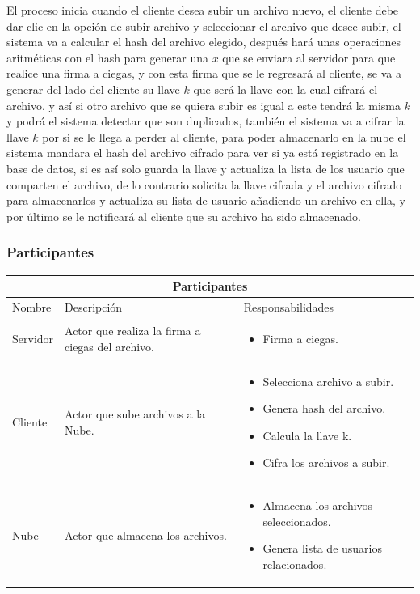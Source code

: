 El proceso inicia cuando el cliente desea subir un archivo nuevo, el cliente debe dar clic en la opción de subir archivo y seleccionar el archivo que desee subir, el sistema va a calcular el hash del archivo elegido, después hará unas operaciones aritméticas con el hash para generar una $x$ que se enviara al servidor para que realice una firma a ciegas, y con esta firma que se le regresará al cliente, se va a generar del lado del cliente su llave $k$ que será la llave con la cual cifrará el archivo, y así si otro archivo que se quiera subir es igual a este tendrá la misma $k$ y podrá el sistema detectar que son duplicados, también el sistema va a cifrar la llave $k$ por si se le llega a perder al cliente, para poder almacenarlo en la nube el sistema mandara el hash del archivo cifrado para ver si ya está registrado en la base de datos, si es así solo guarda la llave y actualiza la lista de los usuario que comparten el archivo, de lo contrario solicita la llave cifrada y el archivo cifrado para almacenarlos y actualiza su lista de usuario añadiendo un archivo en ella, y por último se le notificará al cliente que su archivo ha sido almacenado.



\subsubsection{Participantes}

\begin{tabular}{ |p{2cm}|p{6cm}|p{6cm}| }
\hline
\multicolumn{3}{|c|}{ Participantes } \\
\hline

{ Nombre } & { Descripción } & { Responsabilidades} \\
\hline
{ Servidor } & Actor que realiza la firma a ciegas del archivo. & 
\begin{itemize} 
\item Firma a ciegas.

\end{itemize} \\ 
\hline
{ Cliente } & Actor que sube archivos a la Nube. & 
\begin{itemize} 
\item Selecciona archivo a subir.
\item Genera hash del archivo. 
\item Calcula la llave k.
\item Cifra los archivos a subir.
\end{itemize} \\ 
\hline
{ Nube } & Actor que almacena los archivos. & 
\begin{itemize} 
\item Almacena los archivos seleccionados.
\item Genera lista de usuarios relacionados.
\end{itemize} \\ 
\hline
\end{tabular}


